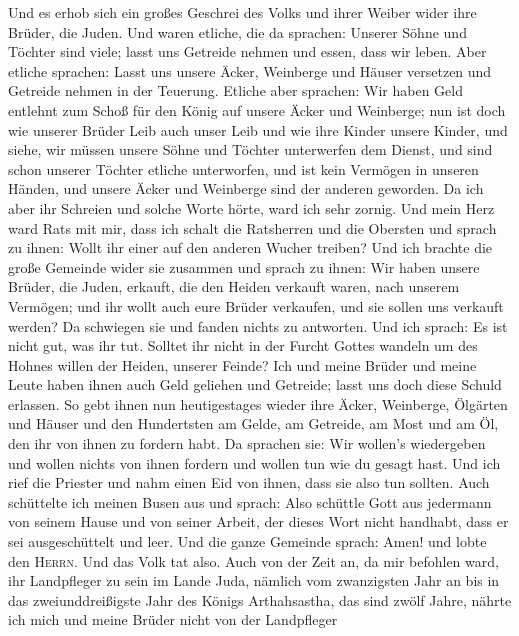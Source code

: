  Und es erhob sich ein großes Geschrei des Volks und ihrer
Weiber wider ihre Brüder, die Juden.  Und waren etliche,
die da sprachen: Unserer Söhne und Töchter sind viele; lasst uns
Getreide nehmen und essen, dass wir leben.  Aber etliche
sprachen: Lasst uns unsere Äcker, Weinberge und Häuser versetzen und
Getreide nehmen in der Teuerung.  Etliche aber sprachen:
Wir haben Geld entlehnt zum Schoß für den König auf unsere Äcker und
Weinberge;  nun ist doch wie unserer Brüder Leib auch
unser Leib und wie ihre Kinder unsere Kinder, und siehe, wir müssen
unsere Söhne und Töchter unterwerfen dem Dienst, und sind schon unserer
Töchter etliche unterworfen, und ist kein Vermögen in unseren Händen,
und unsere Äcker und Weinberge sind der anderen geworden. 
Da ich aber ihr Schreien und solche Worte hörte, ward ich sehr zornig.
 Und mein Herz ward Rats mit mir, dass ich schalt die
Ratsherren und die Obersten und sprach zu ihnen: Wollt ihr einer auf den
anderen Wucher treiben? Und ich brachte die große Gemeinde wider sie
zusammen  und sprach zu ihnen: Wir haben unsere Brüder,
die Juden, erkauft, die den Heiden verkauft waren, nach unserem
Vermögen; und ihr wollt auch eure Brüder verkaufen, und sie sollen uns
verkauft werden? Da schwiegen sie und fanden nichts zu antworten.
 Und ich sprach: Es ist nicht gut, was ihr tut. Solltet
ihr nicht in der Furcht Gottes wandeln um des Hohnes willen der Heiden,
unserer Feinde?  Ich und meine Brüder und meine Leute
haben ihnen auch Geld geliehen und Getreide; lasst uns doch diese Schuld
erlassen.  So gebt ihnen nun heutigestages wieder ihre
Äcker, Weinberge, Ölgärten und Häuser und den Hundertsten am Gelde, am
Getreide, am Most und am Öl, den ihr von ihnen zu fordern habt.
 Da sprachen sie: Wir wollen's wiedergeben und wollen
nichts von ihnen fordern und wollen tun wie du gesagt hast. Und ich rief
die Priester und nahm einen Eid von ihnen, dass sie also tun sollten.
 Auch schüttelte ich meinen Busen aus und sprach: Also
schüttle Gott aus jedermann von seinem Hause und von seiner Arbeit, der
dieses Wort nicht handhabt, dass er sei ausgeschüttelt und leer. Und die
ganze Gemeinde sprach: Amen! und lobte den \textsc{Herrn}. Und das Volk
tat also.  Auch von der Zeit an, da mir befohlen ward,
ihr Landpfleger zu sein im Lande Juda, nämlich vom zwanzigsten Jahr an
bis in das zweiunddreißigste Jahr des Königs Arthahsastha, das sind
zwölf Jahre, nährte ich mich und meine Brüder nicht von der Landpfleger
